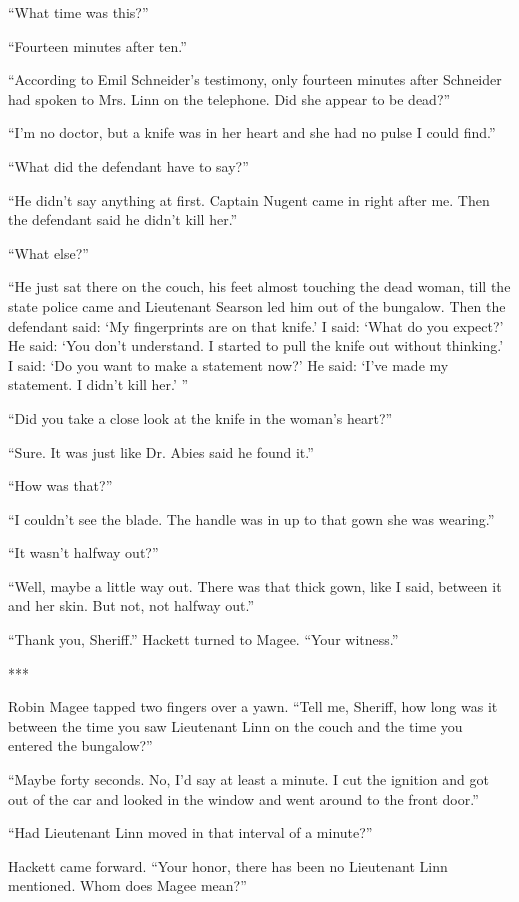 \documentclass{novel}
\begin{document}
“What time was this?”

“Fourteen minutes after ten.”

“According to Emil Schneider’s testimony, only fourteen minutes after Schneider had spoken to Mrs. Linn on the telephone. Did she appear to be dead?”

“I’m no doctor, but a knife was in her heart and she had no pulse I could find.”

“What did the defendant have to say?”

“He didn’t say anything at first. Captain Nugent came in right after me. Then the defendant said he didn’t kill her.”

“What else?”

“He just sat there on the couch, his feet almost touching the dead woman, till the state police came and Lieutenant Searson led him out of the bungalow. Then the defendant said: ‘My fingerprints are on that knife.’ I said: ‘What do you expect?’ He said: ‘You don’t understand. I started to pull the knife out without thinking.’ I said: ‘Do you want to make a statement now?’ He said: ‘I’ve made my statement. I didn’t kill her.’ ”

“Did you take a close look at the knife in the woman’s heart?”

“Sure. It was just like Dr. Abies said he found it.”

“How was that?”

“I couldn’t see the blade. The handle was in up to that gown she was wearing.”

“It wasn’t halfway out?”

“Well, maybe a little way out. There was that thick gown, like I said, between it and her skin. But not, not halfway out.”

“Thank you, Sheriff.” Hackett turned to Magee. “Your witness.”

***

Robin Magee tapped two fingers over a yawn. “Tell me, Sheriff, how long was it between the time you saw Lieutenant Linn on the couch and the time you entered the bungalow?”

“Maybe forty seconds. No, I’d say at least a minute. I cut the ignition and got out of the car and looked in the window and went around to the front door.”

“Had Lieutenant Linn moved in that interval of a minute?”

Hackett came forward. “Your honor, there has been no Lieutenant Linn mentioned. Whom does Magee mean?”
\end{document}
